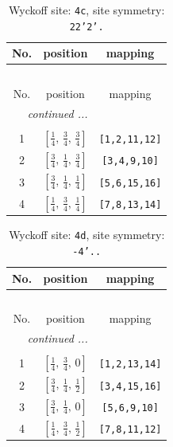 \documentclass[fleqn,8pt]{jsarticle}
\begin{document}
\renewcommand{\arraystretch}{1.2}
\begin{longtable}{ccc}
\caption{Wyckoff site: {\tt 4c}, site symmetry: {\tt 22'2'.}}
 \\
 \hline \hline
No. & position & mapping \\ \hline \endfirsthead

\multicolumn{2}{l}{\tablename\ \thetable{}} \\
 \hline \hline
No. & position & mapping \\ \hline \endhead

 \hline \hline
\multicolumn{2}{r}{\footnotesize\it continued ...} \\ \endfoot

 \hline \hline
\multicolumn{2}{r}{} \\ \endlastfoot

1 & $\left[ \frac{1}{4},\, \frac{3}{4},\, \frac{3}{4} \right]$ & {\tt [1,2,11,12]} \\ \hline
2 & $\left[ \frac{3}{4},\, \frac{1}{4},\, \frac{3}{4} \right]$ & {\tt [3,4,9,10]} \\ \hline
3 & $\left[ \frac{3}{4},\, \frac{1}{4},\, \frac{1}{4} \right]$ & {\tt [5,6,15,16]} \\ \hline
4 & $\left[ \frac{1}{4},\, \frac{3}{4},\, \frac{1}{4} \right]$ & {\tt [7,8,13,14]} \\
\end{longtable}
\renewcommand{\arraystretch}{1.2}
\begin{longtable}{ccc}
\caption{Wyckoff site: {\tt 4d}, site symmetry: {\tt -4'..}}
 \\
 \hline \hline
No. & position & mapping \\ \hline \endfirsthead

\multicolumn{2}{l}{\tablename\ \thetable{}} \\
 \hline \hline
No. & position & mapping \\ \hline \endhead

 \hline \hline
\multicolumn{2}{r}{\footnotesize\it continued ...} \\ \endfoot

 \hline \hline
\multicolumn{2}{r}{} \\ \endlastfoot

1 & $\left[ \frac{1}{4},\, \frac{3}{4},\, 0 \right]$ & {\tt [1,2,13,14]} \\ \hline
2 & $\left[ \frac{3}{4},\, \frac{1}{4},\, \frac{1}{2} \right]$ & {\tt [3,4,15,16]} \\ \hline
3 & $\left[ \frac{3}{4},\, \frac{1}{4},\, 0 \right]$ & {\tt [5,6,9,10]} \\ \hline
4 & $\left[ \frac{1}{4},\, \frac{3}{4},\, \frac{1}{2} \right]$ & {\tt [7,8,11,12]} \\
\end{longtable}
\end{document}
